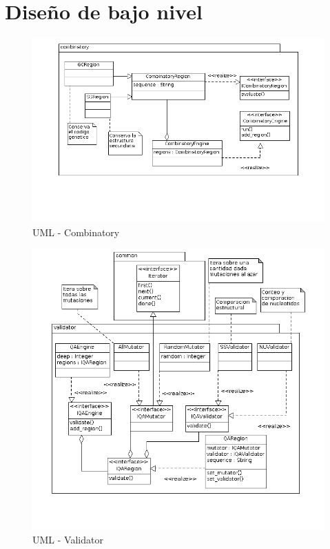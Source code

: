 \section{Dise\~no de bajo nivel}
\label{lld}  
    \begin{figure}
      \centering
      \includegraphics[scale=0.5]{lld-combinatory.png}  
      \caption{UML - Combinatory}
      \label{uml:2}
    \end{figure}

    \begin{figure}
      \centering
      \includegraphics[scale=0.5]{lld-validator.png}  
      \caption{UML - Validator}
      \label{uml:3}
    \end{figure}